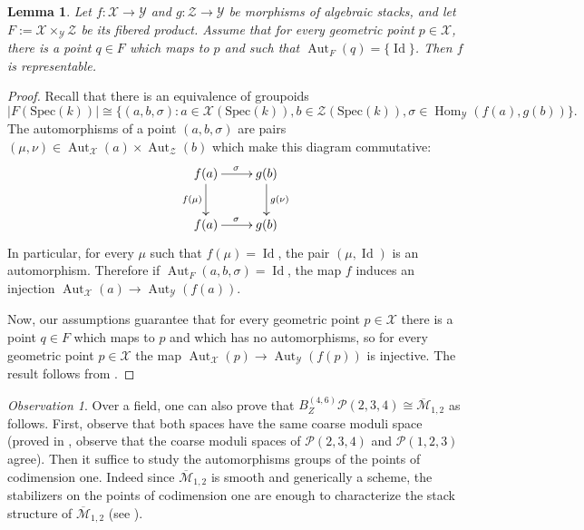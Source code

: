 \documentclass[11pt]{amsart}
\newtheorem{lemma}[theorem]{Lemma}
\theoremstyle{definition}
\theoremstyle{remark}
\newtheorem{observation}{Observation}
\newcommand{\calM}{\mathcal M}
\newcommand{\calX}{\mathcal X}
\newcommand{\calP}{\mathcal P}
\newcommand{\calY}{\mathcal Y}
\newcommand{\calZ}{\mathcal Z}
\newcommand{\Spec}{\mathrm{Spec}}
\begin{document}
\begin{lemma}\label{lemma_representable_automorphisms_fibred_product}
Let $f:\calX\to \calY$ and $g:\calZ \to \calY$ be morphisms of algebraic stacks, and let $F:= \calX\times_{\calY}\calZ$ be its fibered product. Assume that for every geometric point $p\in \calX$, there is a point $q \in F$ which maps to $p$ and such that $\operatorname{Aut}_F(q) = \{\operatorname{Id}\}$. Then $f$ is representable.
\end{lemma}
\begin{proof}
Recall that there is an equivalence of groupoids 
$$|F(\Spec(k))| \cong \{(a,b,\sigma): a \in \calX(\Spec(k)), b\in \calZ(\Spec(k)), \sigma \in \operatorname{Hom}_{\calY}(f(a),g(b)) \}.$$
 The automorphisms of a point $(a,b,\sigma)$ are pairs $(\mu,\nu)\in \operatorname{Aut}_{\calX}(a) \times \operatorname{Aut}_{\calZ}(b)$ which make this diagram commutative:
$$\xymatrix{ f(a) \ar[d]_{f(\mu)} \ar[r]^{\sigma} & g(b)\ar[d]^{g(\nu)} \\
f(a) \ar[r]^{\sigma} & g(b)}$$
In particular, for every $\mu$ such that $f(\mu) = \operatorname{Id}$, the pair $(\mu,\operatorname{Id})$ is an automorphism. Therefore if $\operatorname{Aut}_F(a,b,\sigma) = \operatorname{Id}$, the map $f$ induces an injection $\operatorname{Aut}_{\calX}(a) \to \operatorname{Aut}_{\calY}(f(a))$.

Now, our assumptions guarantee that for every geometric point $p\in \calX$ there is a point $q \in F$ which maps to $p$ and which has no automorphisms, so for every geometric point $p \in \calX$ the map $\operatorname{Aut}_{\calX}(p) \to \operatorname{Aut}_{\calY}(f(p))$ is injective. The result follows from \cite[Lemma 2.3.9]{AH}.\end{proof}
\begin{observation}
Over a field, one can also prove that $B_Z^{(4,6)}\calP(2,3,4) \cong \overline{\calM}_{1,2}$ as follows. First, observe that both spaces have the same coarse moduli space (proved in \cite[Theorem 2.3]{Mas14}, observe that the coarse moduli spaces of $\calP(2,3,4)$ and $\calP(1,2,3)$ agree). Then it suffice to study the automorphisms groups of the points of codimension one. Indeed since $\overline{\calM}_{1,2}$ is smooth and generically a scheme, the stabilizers on the points of codimension one are enough to characterize the stack structure of $\overline{\calM}_{1,2}$ (see  \cite[Theorem 1]{Ger17}). 
\end{observation}
\end{document}

